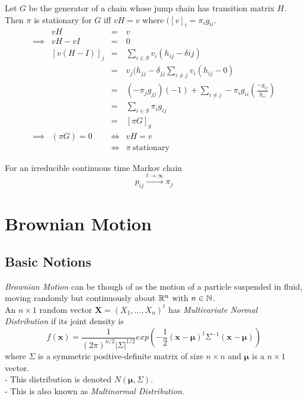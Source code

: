 \documentclass[11pt,a4paper]{article}
\begin{document}
\theorem{}
Let $G$ be the generator of a chain whose jump chain has transition matrix $H$.\\
Then $\pi$ is stationary for $G$ iff $vH=v$ where $([v]_i=\pi_ig_{ii}$.\\

\[\begin{array}{rrcl}
&vH&=&v\\
\implies&vH-vI&=&0\\
&[v(H-I)]_j&=&\sum_{i\in S}v_i(h_{ij}-\delta{ij})\\
&&=&v_j(h_{jj}-\delta_{jj}\sum_{i\neq j}v_i(h_{ij}-0)\\
&&=&(-\pi_jg_{jj})(-1)+\sum_{i\neq j}-\pi_ig_{ii}\left(\frac{-g_{ij}}{g_{ii}}\right)\\
&&=&\sum_{i\in S}\pi_ig_{ij}\\
&&=&[\pi  G]_g\\
\implies&(\pi G)=0&\Leftrightarrow&vH=v\\
&&\Leftrightarrow&\pi\mathrm{\ stationary}
\end{array}\]

\theorem{}
For an irreducible continuous time Markov chain
$$p_{ij}\xrightarrow{t\to\infty}\pi_j$$

\section{Brownian Motion}

\subsection{Basic Notions}

\textit{Brownian Motion} can be though of as the motion of a particle suspended in fluid, moving randomly but continuously about $\mathbb{R}^n$ with $n\in\mathbb{N}$.\\

An $n\times1$ random vector $\pmb{X}=(X_1,\dots,X_n)^t$ has \textit{Multivariate Normal Distribution} if its joint density is
$$f(\pmb{x})=\frac{1}{(2\pi)^{n/2}|\Sigma|^{1/2}}exp\left(-\frac{1}{2}(\pmb{x}-\pmb{\mu})^t\Sigma^{-1}(\pmb{x}-\pmb{\mu})\right)$$
where $\Sigma$ is a symmetric positive-definite matrix of size $n\times n$ and $\pmb{\mu}$ is a $n\times 1$ vector.\\
\nb - This distribution is denoted $N(\pmb{\mu},\Sigma)$.\\
\nb - This is also known as \textit{Multinormal Distribution}.\\
\end{document}
